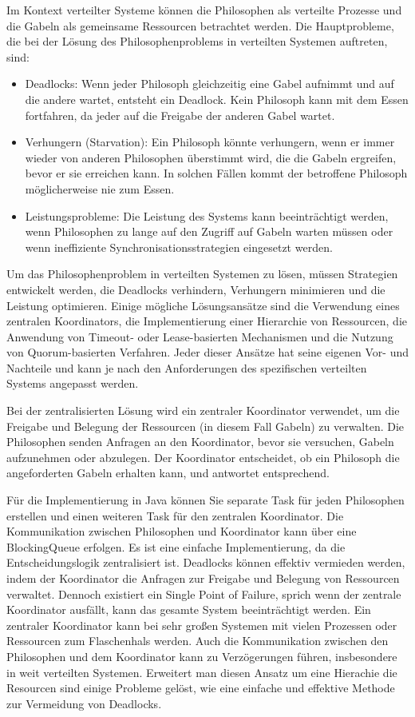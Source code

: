 Im Kontext verteilter Systeme können die Philosophen als verteilte Prozesse und die Gabeln als gemeinsame Ressourcen betrachtet werden. Die Hauptprobleme, die bei der Lösung des Philosophenproblems in verteilten Systemen auftreten, sind:
\begin{itemize}
\item Deadlocks: Wenn jeder Philosoph gleichzeitig eine Gabel aufnimmt und auf die andere wartet, entsteht ein Deadlock. Kein Philosoph kann mit dem Essen fortfahren, da jeder auf die Freigabe der anderen Gabel wartet.
\item Verhungern (Starvation): Ein Philosoph könnte verhungern, wenn er immer wieder von anderen Philosophen überstimmt wird, die die Gabeln ergreifen, bevor er sie erreichen kann. In solchen Fällen kommt der betroffene Philosoph möglicherweise nie zum Essen.
\item Leistungsprobleme: Die Leistung des Systems kann beeinträchtigt werden, wenn Philosophen zu lange auf den Zugriff auf Gabeln warten müssen oder wenn ineffiziente Synchronisationsstrategien eingesetzt werden.
\end{itemize}

Um das Philosophenproblem in verteilten Systemen zu lösen, müssen Strategien entwickelt werden, die Deadlocks verhindern, Verhungern minimieren und die Leistung optimieren. Einige mögliche Lösungsansätze sind die Verwendung eines zentralen Koordinators, die Implementierung einer Hierarchie von Ressourcen, die Anwendung von Timeout- oder Lease-basierten Mechanismen und die Nutzung von Quorum-basierten Verfahren. Jeder dieser Ansätze hat seine eigenen Vor- und Nachteile und kann je nach den Anforderungen des spezifischen verteilten Systems angepasst werden.

Bei der zentralisierten Lösung wird ein zentraler Koordinator verwendet, um die Freigabe und Belegung der Ressourcen (in diesem Fall Gabeln) zu verwalten. Die Philosophen senden Anfragen an den Koordinator, bevor sie versuchen, Gabeln aufzunehmen oder abzulegen. Der Koordinator entscheidet, ob ein Philosoph die angeforderten Gabeln erhalten kann, und antwortet entsprechend.

Für die Implementierung in Java können Sie separate Task für jeden Philosophen erstellen und einen weiteren Task für den zentralen Koordinator. Die Kommunikation zwischen Philosophen und Koordinator kann über eine BlockingQueue erfolgen.
Es ist eine einfache Implementierung, da die Entscheidungslogik zentralisiert ist. Deadlocks können effektiv vermieden werden, indem der Koordinator die Anfragen zur Freigabe und Belegung von Ressourcen verwaltet.
Dennoch existiert ein Single Point of Failure, sprich wenn der zentrale Koordinator ausfällt, kann das gesamte System beeinträchtigt werden.
Ein zentraler Koordinator kann bei sehr großen Systemen mit vielen Prozessen oder Ressourcen zum Flaschenhals werden. Auch die Kommunikation zwischen den Philosophen und dem Koordinator kann zu Verzögerungen führen, insbesondere in weit verteilten Systemen.
Erweitert man diesen Ansatz um eine Hierachie die Resourcen sind einige Probleme gelöst, wie eine einfache und effektive Methode zur Vermeidung von Deadlocks.

